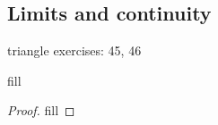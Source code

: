 \subsection{Limits and continuity}

triangle exercises: 45, 46

\begin{exercise}{1}
fill
\end{exercise}
\begin{proof}
fill
\end{proof}
